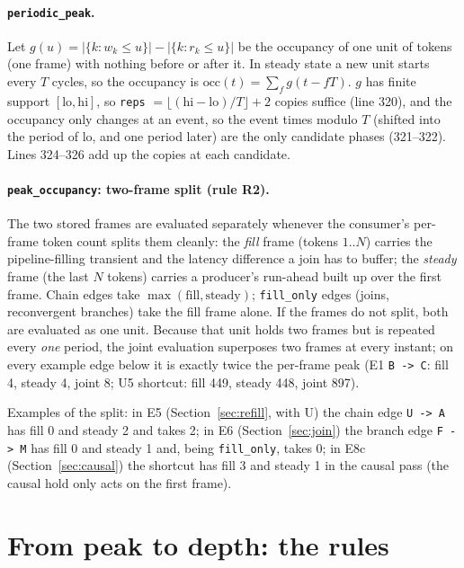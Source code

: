 \documentclass[10pt,a4paper]{article}
\newcommand{\code}[1]{\texttt{#1}}
\newcommand{\Tg}{T}           %
\newcommand{\NF}{N}            %
\begin{document}
\paragraph{\code{periodic\_peak}.} Let $g(u)=|\{k: w_k\le u\}|-|\{k: r_k\le u\}|$
be the occupancy of one unit of tokens (one frame) with nothing before or after it.
In steady state a new unit starts every $\Tg$ cycles, so the occupancy is
$\mathrm{occ}(t)=\sum_{f} g(t-f\Tg)$. $g$ has finite support $[\mathrm{lo},\mathrm{hi}]$,
so \code{reps} $=\lfloor(\mathrm{hi}-\mathrm{lo})/\Tg\rfloor+2$ copies suffice
(line 320), and the occupancy only changes at an event, so the event times modulo
$\Tg$ (shifted into the period of lo, and one period later) are the only candidate
phases (321--322). Lines 324--326 add up the copies at each candidate.

\paragraph{\code{peak\_occupancy}: two-frame split (rule R2).} The two stored
frames are evaluated separately whenever the consumer's per-frame token count
splits them cleanly: the \emph{fill} frame (tokens $1..\NF$) carries the
pipeline-filling transient and the latency difference a join has to buffer; the
\emph{steady} frame (the last $\NF$ tokens) carries a producer's run-ahead built
up over the first frame. Chain edges take $\max(\text{fill},\text{steady})$;
\code{fill\_only} edges (joins, reconvergent branches) take the fill frame
alone. If the frames do not split, both are evaluated as one unit. Because that
unit holds two frames but is repeated every \emph{one} period, the joint
evaluation superposes two frames at every instant; on every example edge below it
is exactly twice the per-frame peak (E1 \code{B -> C}: fill 4, steady 4, joint
8; U5 shortcut: fill 449, steady 448, joint 897).

Examples of the split: in E5 (Section~\ref{sec:refill}, with U) the chain edge
\code{U -> A} has fill 0 and steady 2 and takes 2; in E6
(Section~\ref{sec:join}) the branch edge \code{F -> M} has fill 0 and steady 1
and, being \code{fill\_only}, takes 0; in E8c (Section~\ref{sec:causal}) the
shortcut has fill 3 and steady 1 in the causal pass (the causal hold only
acts on the first frame).

\section{From peak to depth: the rules}\label{sec:rules}
\end{document}
